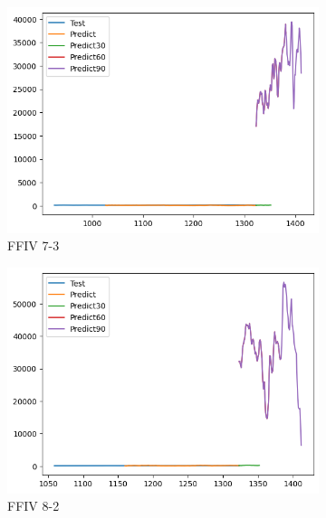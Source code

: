 \documentclass{ieeeojies}
\begin{document}
\begin{figure}[H]
    \centering
    \begin{subfigure}[b]{0.33\linewidth}
        \centering
        \includegraphics[width=\linewidth]{AddRNN Plot/AddRNN_FFIV_7_3.png}
        \caption{FFIV 7-3}
        \label{fig:ffiv-7-3}
    \end{subfigure}%
    \hfill
    \begin{subfigure}[b]{0.33\linewidth}
        \centering
        \includegraphics[width=\linewidth]{AddRNN Plot/AddRNN_FFIV_8_2.png}
        \caption{FFIV 8-2}
        \label{fig:ffiv-8-2}
    \end{subfigure}%
    \hfill
    \begin{subfigure}[b]{0.33\linewidth}
        \centering

\end{subfigure}
\end{figure}
\end{document}
